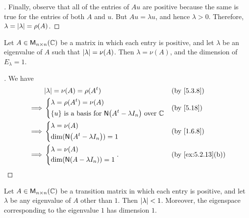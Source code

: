 \begin{proof}[]
	Finally, observe that all of the entries of \(Au\) are positive because the same is true for the entries of both \(A\) and \(u\).
	But \(Au = \lambda u\), and hence \(\lambda > 0\).
	Therefore, \(\lambda = \left\lvert\lambda\right\rvert = \rho(A)\).
\end{proof}

\begin{cor}\label{5.3.13}
	Let \(A \in \mathsf{M}_{{n} \times n}({\mathbb{C}})\) be a matrix in which each entry is positive, and let \(\lambda\) be an eigenvalue of \(A\) such that \(\left\lvert\lambda\right\rvert = \nu(A)\).
	Then \(\lambda = \nu(A)\), and the dimension of \(E_{\lambda} = 1\).
\end{cor}

\begin{proof}[]
	We have
	\begin{align*}
		         & \abs{\lambda} = \nu(A) = \rho(\tp{A})                                                       &  & \by{5.3.8} \\
		\implies & \begin{dcases}
			           \lambda = \rho(\tp{A}) = \nu(A) \\
			           \set{u} \text{ is a basis for } \ns{\tp{A} - \lambda I_n} \text{ over } \C
		           \end{dcases} &  & \by{5.18}                  \\
		\implies & \begin{dcases}
			           \lambda = \nu(A) \\
			           \dim(\ns{\tp{A} - \lambda I_n}) = 1
		           \end{dcases}                          &  & \by{1.6.8}                                           \\
		\implies & \begin{dcases}
			           \lambda = \nu(A) \\
			           \dim(\ns{A - \lambda I_n}) = 1
		           \end{dcases}.                                                              &  & \by{ex:5.2.13}[b]
	\end{align*}
\end{proof}

\begin{cor}\label{5.3.14}
	Let \(A \in \mathsf{M}_{{n} \times n}({\mathbb{C}})\) be a transition matrix in which each entry is positive, and let \(\lambda\) be any eigenvalue of \(A\) other than \(1\).
	Then \(\left\lvert\lambda\right\rvert < 1\).
	Moreover, the eigenspace corresponding to the eigenvalue \(1\) has dimension \(1\).
\end{cor}

